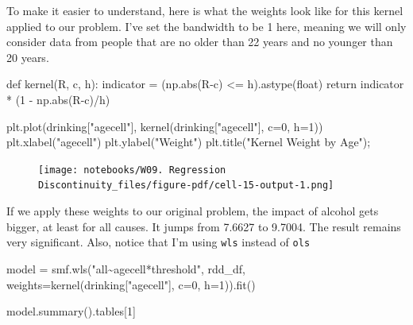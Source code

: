 \documentclass[
  letterpaper,
  DIV=11,
  numbers=noendperiod]{scrreprt}
\newenvironment{Shaded}{\begin{snugshade}}{\end{snugshade}}
\newcommand{\BuiltInTok}[1]{\textcolor[rgb]{0.00,0.23,0.31}{#1}}
\newcommand{\ControlFlowTok}[1]{\textcolor[rgb]{0.00,0.23,0.31}{#1}}
\newcommand{\DecValTok}[1]{\textcolor[rgb]{0.68,0.00,0.00}{#1}}
\newcommand{\KeywordTok}[1]{\textcolor[rgb]{0.00,0.23,0.31}{#1}}
\newcommand{\NormalTok}[1]{\textcolor[rgb]{0.00,0.23,0.31}{#1}}
\newcommand{\OperatorTok}[1]{\textcolor[rgb]{0.37,0.37,0.37}{#1}}
\newcommand{\StringTok}[1]{\textcolor[rgb]{0.13,0.47,0.30}{#1}}
\begin{document}
To make it easier to understand, here is what the weights look like for
this kernel applied to our problem. I've set the bandwidth to be 1 here,
meaning we will only consider data from people that are no older than 22
years and no younger than 20 years.

\begin{Shaded}
\begin{Highlighting}[]
\KeywordTok{def}\NormalTok{ kernel(R, c, h):}
\NormalTok{    indicator }\OperatorTok{=}\NormalTok{ (np.}\BuiltInTok{abs}\NormalTok{(R}\OperatorTok{{-}}\NormalTok{c) }\OperatorTok{\textless{}=}\NormalTok{ h).astype(}\BuiltInTok{float}\NormalTok{)}
    \ControlFlowTok{return}\NormalTok{ indicator }\OperatorTok{*}\NormalTok{ (}\DecValTok{1} \OperatorTok{{-}}\NormalTok{ np.}\BuiltInTok{abs}\NormalTok{(R}\OperatorTok{{-}}\NormalTok{c)}\OperatorTok{/}\NormalTok{h)}
\end{Highlighting}
\end{Shaded}

\begin{Shaded}
\begin{Highlighting}[]
\NormalTok{plt.plot(drinking[}\StringTok{"agecell"}\NormalTok{], kernel(drinking[}\StringTok{"agecell"}\NormalTok{], c}\OperatorTok{=}\DecValTok{0}\NormalTok{, h}\OperatorTok{=}\DecValTok{1}\NormalTok{))}
\NormalTok{plt.xlabel(}\StringTok{"agecell"}\NormalTok{)}
\NormalTok{plt.ylabel(}\StringTok{"Weight"}\NormalTok{)}
\NormalTok{plt.title(}\StringTok{"Kernel Weight by Age"}\NormalTok{)}\OperatorTok{;}
\end{Highlighting}
\end{Shaded}

\begin{figure}[H]

{\centering \texttt{[image: notebooks/W09. Regression Discontinuity\_files/figure-pdf/cell-15-output-1.png]}

}

\end{figure}

If we apply these weights to our original problem, the impact of alcohol
gets bigger, at least for all causes. It jumps from 7.6627 to 9.7004.
The result remains very significant. Also, notice that I'm using
\texttt{wls} instead of \texttt{ols}

\begin{Shaded}
\begin{Highlighting}[]
\NormalTok{model }\OperatorTok{=}\NormalTok{ smf.wls(}\StringTok{"all\textasciitilde{}agecell*threshold"}\NormalTok{, rdd\_df,}
\NormalTok{                weights}\OperatorTok{=}\NormalTok{kernel(drinking[}\StringTok{"agecell"}\NormalTok{], c}\OperatorTok{=}\DecValTok{0}\NormalTok{, h}\OperatorTok{=}\DecValTok{1}\NormalTok{)).fit()}

\NormalTok{model.summary().tables[}\DecValTok{1}\NormalTok{]}
\end{Highlighting}
\end{Shaded}
\end{document}
